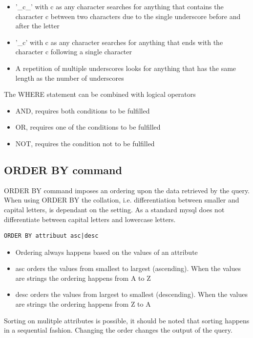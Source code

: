 \documentclass{article}
\begin{document}
\begin{enumerate}
\begin{itemize}
\begin{itemize}
\begin{itemize}
                \item '\_c\_' with c as any character searches for anything that contains the character c between two characters due to the single underscore before and after the letter
                \item '\_c' with c as any character searches for anything that ends with the character c following a single character
                \item A repetition of multiple underscores looks for anything that has the same length as the number of underscores 
            \end{itemize} 
        \end{itemize}
    \end{itemize}
\end{enumerate}
The WHERE statement can be combined with logical operators 
\begin{itemize}
    \item AND, requires both conditions to be fulfilled 
    \item OR, requires one of the conditions to be fulfilled 
    \item NOT, requires the condition not to be fulfilled
\end{itemize}

\subsection{ORDER BY command}

ORDER BY command imposes an ordering upon the data retrieved by the query. When using ORDER BY the collation, i.e. differentiation between smaller and capital letters, is dependant on the setting.
As a standard mysql does not differentiate between capital letters and lowercase letters.
\begin{lstlisting}[frame=single]
    ORDER BY attribuut asc|desc
\end{lstlisting}
\begin{itemize}
    \item Ordering always happens based on the values of an attribute 
    \item asc orders the values from smallest to largest (ascending). When the values are strings the ordering happens from A to Z
    \item desc orders the values from largest to smallest (descending). When the values are strings the ordering happens from Z to A
\end{itemize}
Sorting on mulitple attributes is possible, it should be noted that sorting happens in a sequential fashion. Changing the order changes the output of the query.
\end{document}

